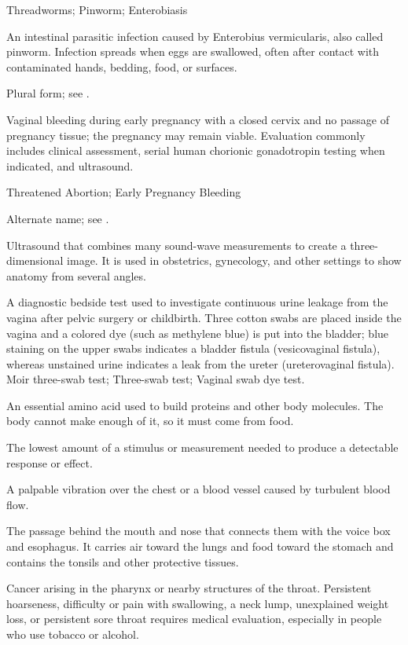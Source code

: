 \synonyms
Threadworms; Pinworm; Enterobiasis

 An intestinal parasitic infection caused by Enterobius vermicularis, also called
pinworm. Infection spreads when eggs are swallowed, often after contact with contaminated hands, bedding, food, or
surfaces.

 Plural form; see .

 Vaginal bleeding during early pregnancy with a closed cervix and no passage of pregnancy tissue; the pregnancy may remain viable.
Evaluation commonly includes clinical assessment, serial human chorionic gonadotropin testing when indicated, and ultrasound.

\synonyms
Threatened Abortion; Early Pregnancy Bleeding

 Alternate name; see .

 Ultrasound that combines many sound-wave measurements to create a three-dimensional image. It is used in obstetrics, gynecology, and other settings to show anatomy from several angles.

 A diagnostic bedside test used to investigate continuous urine leakage from the vagina after pelvic surgery or childbirth. Three cotton swabs are placed inside the vagina and a colored dye (such as methylene blue) is put into the bladder; blue staining on the upper swabs indicates a bladder fistula (vesicovaginal fistula), whereas unstained urine indicates a leak from the ureter (ureterovaginal fistula).
\synonyms Moir three-swab test; Three-swab test; Vaginal swab dye test.

 An essential amino acid used to build proteins and other body molecules. The body cannot make enough of it, so it must come from food.

 The lowest amount of a stimulus or measurement needed to produce a detectable response or effect.

 A palpable vibration over the chest or a blood vessel caused by turbulent blood flow.

 The passage behind the mouth and nose that connects them with the voice box and esophagus. It carries air toward the lungs and food toward the stomach and contains the tonsils and other protective tissues.

 Cancer arising in the pharynx or nearby structures of the throat. Persistent hoarseness, difficulty or pain
with swallowing, a neck lump, unexplained weight loss, or persistent sore throat requires
medical evaluation, especially in people who use tobacco or alcohol.

